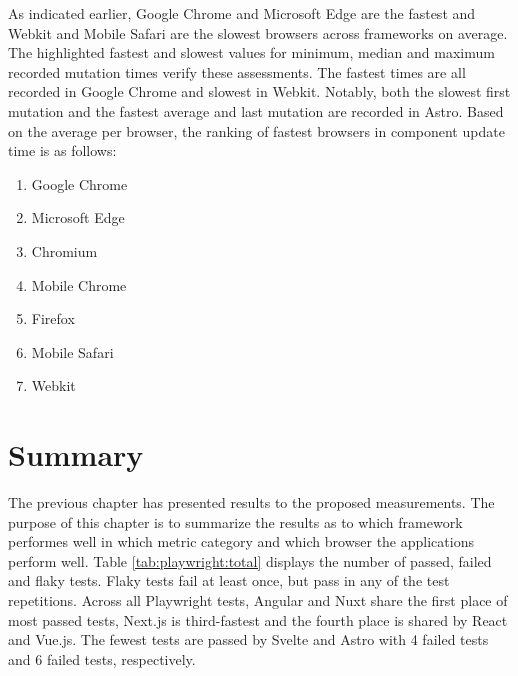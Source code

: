 \documentclass[a4paper, 10pt]{article}
\begin{document}
As indicated earlier, Google Chrome and Microsoft Edge are the fastest and Webkit and Mobile Safari are the slowest browsers across frameworks on average.
The highlighted fastest and slowest values for minimum, median and maximum recorded mutation times verify these assessments.
The fastest times are all recorded in Google Chrome and slowest in Webkit.
Notably, both the slowest first mutation and the fastest average and last mutation are recorded in Astro.
Based on the average per browser, the ranking of fastest browsers in component update time is as follows:

\begin{enumerate}
  \item Google Chrome
  \item Microsoft Edge
  \item Chromium
  \item Mobile Chrome
  \item Firefox
  \item Mobile Safari
  \item Webkit
\end{enumerate}

\section{Summary}\label{sec:summary}

The previous chapter has presented results to the proposed measurements.
The purpose of this chapter is to summarize the results as to which framework performes well in which metric category and which browser the applications perform well.
Table \ref{tab:playwright:total} displays the number of passed, failed and flaky tests.
Flaky tests fail at least once, but pass in any of the test repetitions.
Across all Playwright tests, Angular and Nuxt share the first place of most passed tests, Next.js is third-fastest and the fourth place is shared by React and Vue.js.
The fewest tests are passed by Svelte and Astro with 4 failed tests and 6 failed tests, respectively.
\end{document}
